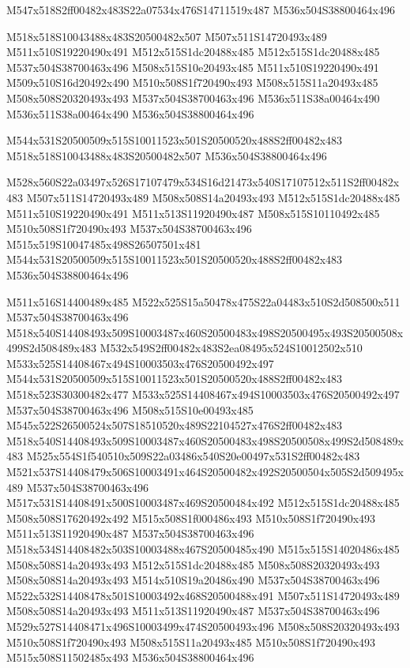 \documentclass{article}
\begin{document}
\begin{multicols}{5}
\begin{center}
M547x518S2ff00482x483S22a07534x476S14711519x487 %
M536x504S38800464x496 %

M518x518S10043488x483S20500482x507 %
M507x511S14720493x489 %
M511x510S19220490x491 %
M512x515S1dc20488x485 %
M512x515S1dc20488x485 %
M537x504S38700463x496 %
M508x515S10e20493x485 %
M511x510S19220490x491 %
M509x510S16d20492x490 %
M510x508S1f720490x493 %
M508x515S11a20493x485 %
M508x508S20320493x493 %
M537x504S38700463x496 %
M536x511S38a00464x490 %
M536x511S38a00464x490 %
M536x504S38800464x496 %

M544x531S20500509x515S10011523x501S20500520x488S2ff00482x483 %
M518x518S10043488x483S20500482x507 %
M536x504S38800464x496 %

M528x560S22a03497x526S17107479x534S16d21473x540S17107512x511S2ff00482x483 %
M507x511S14720493x489 %
M508x508S14a20493x493 %
M512x515S1dc20488x485 %
M511x510S19220490x491 %
M511x513S11920490x487 %
M508x515S10110492x485 %
M510x508S1f720490x493 %
M537x504S38700463x496 %
M515x519S10047485x498S26507501x481 %
M544x531S20500509x515S10011523x501S20500520x488S2ff00482x483 %
M536x504S38800464x496 %

M511x516S14400489x485 %
M522x525S15a50478x475S22a04483x510S2d508500x511 %
M537x504S38700463x496 %
M518x540S14408493x509S10003487x460S20500483x498S20500495x493S20500508x499S2d508489x483 %
M532x549S2ff00482x483S2ea08495x524S10012502x510 %
M533x525S14408467x494S10003503x476S20500492x497 %
M544x531S20500509x515S10011523x501S20500520x488S2ff00482x483 %
M518x523S30300482x477 %
M533x525S14408467x494S10003503x476S20500492x497 %
M537x504S38700463x496 %
M508x515S10e00493x485 %
M545x522S26500524x507S18510520x489S22104527x476S2ff00482x483 %
M518x540S14408493x509S10003487x460S20500483x498S20500508x499S2d508489x483 %
M525x554S1f540510x509S22a03486x540S20e00497x531S2ff00482x483 %
M521x537S14408479x506S10003491x464S20500482x492S20500504x505S2d509495x489 %
M537x504S38700463x496 %
M517x531S14408491x500S10003487x469S20500484x492 %
M512x515S1dc20488x485 %
M508x508S17620492x492 %
M515x508S1f000486x493 %
M510x508S1f720490x493 %
M511x513S11920490x487 %
M537x504S38700463x496 %
M518x534S14408482x503S10003488x467S20500485x490 %
M515x515S14020486x485 %
M508x508S14a20493x493 %
M512x515S1dc20488x485 %
M508x508S20320493x493 %
M508x508S14a20493x493 %
M514x510S19a20486x490 %
M537x504S38700463x496 %
M522x532S14408478x501S10003492x468S20500488x491 %
M507x511S14720493x489 %
M508x508S14a20493x493 %
M511x513S11920490x487 %
M537x504S38700463x496 %
M529x527S14408471x496S10003499x474S20500493x496 %
M508x508S20320493x493 %
M510x508S1f720490x493 %
M508x515S11a20493x485 %
M510x508S1f720490x493 %
M515x508S11502485x493 %
M536x504S38800464x496 %
\end{center}
\end{multicols}
\end{document}
